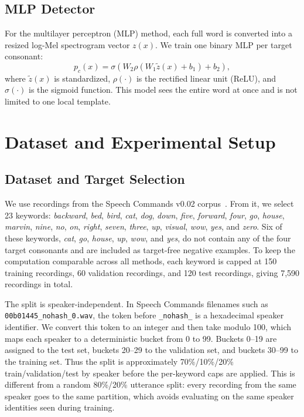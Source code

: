\documentclass[conference]{IEEEtran}
\begin{document}
\subsection{MLP Detector}
For the multilayer perceptron (MLP) method, each full word is converted into a resized log-Mel spectrogram vector $z(x)$. We train one binary MLP per target consonant:
\begin{equation}
p_c(x)=\sigma\!\left(W_2 \rho(W_1 \tilde{z}(x)+b_1)+b_2\right),
\end{equation}
where $\tilde{z}(x)$ is standardized, $\rho(\cdot)$ is the rectified linear unit (ReLU), and $\sigma(\cdot)$ is the sigmoid function. This model sees the entire word at once and is not limited to one local template.

\section{Dataset and Experimental Setup}
\subsection{Dataset and Target Selection}
We use recordings from the Speech Commands v0.02 corpus~\cite{warden2018speech}. From it, we select 23 keywords:
\textit{backward}, \textit{bed}, \textit{bird}, \textit{cat}, \textit{dog}, \textit{down}, \textit{five}, \textit{forward}, \textit{four}, \textit{go}, \textit{house}, \textit{marvin}, \textit{nine}, \textit{no}, \textit{on}, \textit{right}, \textit{seven}, \textit{three}, \textit{up}, \textit{visual}, \textit{wow}, \textit{yes}, and \textit{zero}.
Six of these keywords, \textit{cat}, \textit{go}, \textit{house}, \textit{up}, \textit{wow}, and \textit{yes}, do not contain any of the four target consonants and are included as target-free negative examples. To keep the computation comparable across all methods, each keyword is capped at 150 training recordings, 60 validation recordings, and 120 test recordings, giving 7,590 recordings in total.

The split is speaker-independent. In Speech Commands filenames such as \texttt{00b01445\_nohash\_0.wav}, the token before \texttt{\_nohash\_} is a hexadecimal speaker identifier. We convert this token to an integer and then take modulo 100, which maps each speaker to a deterministic bucket from 0 to 99. Buckets 0--19 are assigned to the test set, buckets 20--29 to the validation set, and buckets 30--99 to the training set. Thus the split is approximately 70\%/10\%/20\% train/validation/test by speaker before the per-keyword caps are applied. This is different from a random 80\%/20\% utterance split: every recording from the same speaker goes to the same partition, which avoids evaluating on the same speaker identities seen during training.
\end{document}
